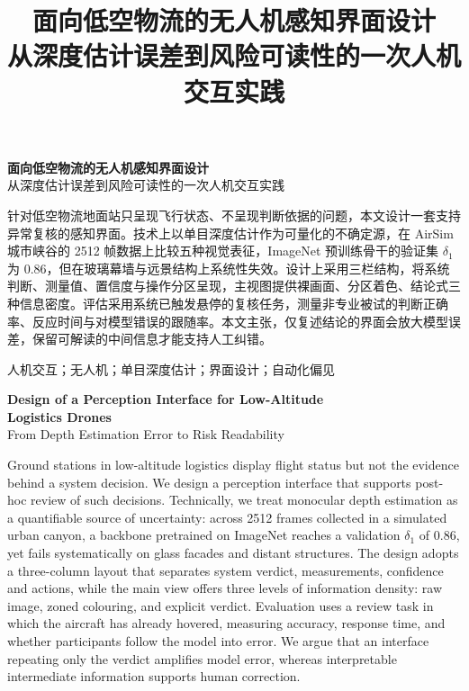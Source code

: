 \documentclass[12pt,a4paper]{ctexart}
\title{\vspace{-1.2cm}\textbf{面向低空物流的无人机感知界面设计}\\[4pt]
\large 从深度估计误差到风险可读性的一次人机交互实践}
\author{}
\date{}
\begin{document}


\begin{center}
{\bfseries 面向低空物流的无人机感知界面设计}\\[4pt]
{从深度估计误差到风险可读性的一次人机交互实践}
\end{center}

\vspace{0.4cm}

针对低空物流地面站只呈现飞行状态、不呈现判断依据的问题，本文设计一套支持异常复核的感知界面。技术上以单目深度估计作为可量化的不确定源，在 AirSim 城市峡谷的 2512 帧数据上比较五种视觉表征，ImageNet 预训练骨干的验证集 $\delta_1$ 为 0.86，但在玻璃幕墙与远景结构上系统性失效。设计上采用三栏结构，将系统判断、测量值、置信度与操作分区呈现，主视图提供裸画面、分区着色、结论式三种信息密度。评估采用系统已触发悬停的复核任务，测量非专业被试的判断正确率、反应时间与对模型错误的跟随率。本文主张，仅复述结论的界面会放大模型误差，保留可解读的中间信息才能支持人工纠错。

\vspace{0.3cm}
人机交互；无人机；单目深度估计；界面设计；自动化偏见

\vspace{0.8cm}

\begin{center}
{\bfseries Design of a Perception Interface for Low-Altitude\\
Logistics Drones}\\[4pt]
{From Depth Estimation Error to Risk Readability}
\end{center}

\vspace{0.3cm}

 Ground stations in low-altitude logistics display flight status but not the evidence behind a system decision. We design a perception interface that supports post-hoc review of such decisions. Technically, we treat monocular depth estimation as a quantifiable source of uncertainty: across 2512 frames collected in a simulated urban canyon, a backbone pretrained on ImageNet reaches a validation $\delta_1$ of 0.86, yet fails systematically on glass facades and distant structures. The design adopts a three-column layout that separates system verdict, measurements, confidence and actions, while the main view offers three levels of information density: raw image, zoned colouring, and explicit verdict. Evaluation uses a review task in which the aircraft has already hovered, measuring accuracy, response time, and whether participants follow the model into error. We argue that an interface repeating only the verdict amplifies model error, whereas interpretable intermediate information supports human correction.
\end{document}
